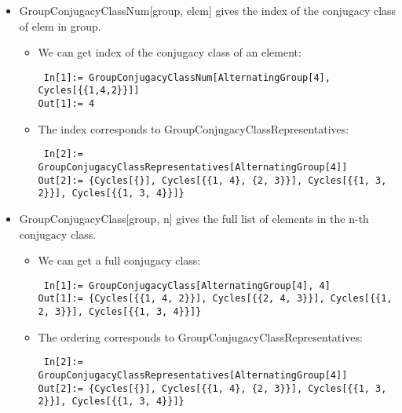 \begin{itemize}
\item GroupConjugacyClassNum[group, elem] gives the index of the conjugacy class of elem in group.
\begin{itemize}
\item We can get index of the conjugacy class of an element:
\begin{lstlisting}
 In[1]:= GroupConjugacyClassNum[AlternatingGroup[4], Cycles[{{1,4,2}}]]
Out[1]:= 4
\end{lstlisting}
\item The index corresponds to GroupConjugacyClassRepresentatives:
\begin{lstlisting}
 In[2]:= GroupConjugacyClassRepresentatives[AlternatingGroup[4]]
Out[2]:= {Cycles[{}], Cycles[{{1, 4}, {2, 3}}], Cycles[{{1, 3, 2}}], Cycles[{{1, 3, 4}}]}
\end{lstlisting}
\end{itemize}

\item GroupConjugacyClass[group, n] gives the full list of elements in the n-th conjugacy class.
\begin{itemize}
\item We can get a full conjugacy class:
\begin{lstlisting}
 In[1]:= GroupConjugacyClass[AlternatingGroup[4], 4]
Out[1]:= {Cycles[{{1, 4, 2}}], Cycles[{{2, 4, 3}}], Cycles[{{1, 2, 3}}], Cycles[{{1, 3, 4}}]}
\end{lstlisting}
\item The ordering corresponds to GroupConjugacyClassRepresentatives:
\begin{lstlisting}
 In[2]:= GroupConjugacyClassRepresentatives[AlternatingGroup[4]]
Out[2]:= {Cycles[{}], Cycles[{{1, 4}, {2, 3}}], Cycles[{{1, 3, 2}}], Cycles[{{1, 3, 4}}]}
\end{lstlisting}
\end{itemize}


\end{itemize}
